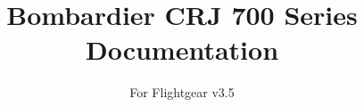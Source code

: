 \usepackage[utf8]{inputenc}
\usepackage{graphicx}

\title{Bombardier CRJ 700 Series Documentation}
\subtitle{For Flightgear v3.5}
\author{}